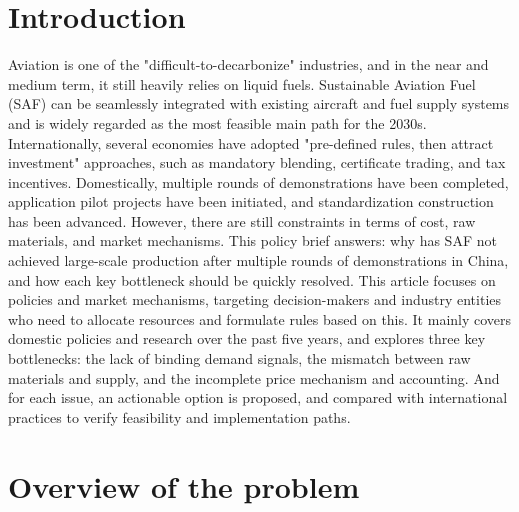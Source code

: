 \documentclass[a4paper,11pt]{article}
\begin{document}
\section{Introduction}
Aviation is one of the "difficult-to-decarbonize" industries, and in the near and medium term, it still heavily relies on liquid fuels. Sustainable Aviation Fuel (SAF) can be seamlessly integrated with existing aircraft and fuel supply systems and is widely regarded as the most feasible main path for the 2030s. Internationally, several economies have adopted "pre-defined rules, then attract investment" approaches, such as mandatory blending, certificate trading, and tax incentives. Domestically, multiple rounds of demonstrations have been completed, application pilot projects have been initiated, and standardization construction has been advanced. However, there are still constraints in terms of cost, raw materials, and market mechanisms. This policy brief answers: why has SAF not achieved large-scale production after multiple rounds of demonstrations in China, and how each key bottleneck should be quickly resolved. This article focuses on policies and market mechanisms, targeting decision-makers and industry entities who need to allocate resources and formulate rules based on this. It mainly covers domestic policies and research over the past five years, and explores three key bottlenecks: the lack of binding demand signals, the mismatch between raw materials and supply, and the incomplete price mechanism and accounting. And for each issue, an actionable option is proposed, and compared with international practices to verify feasibility and implementation paths.

\section{Overview of the problem}
\end{document}
